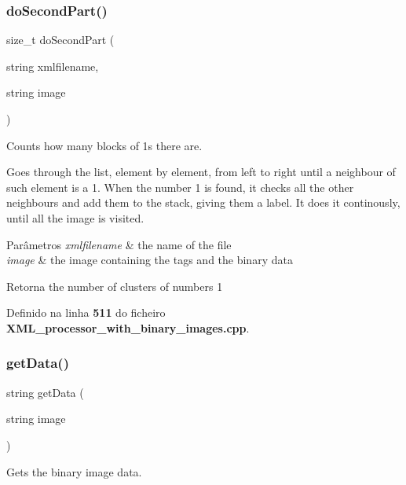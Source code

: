 \subsubsection{do\+Second\+Part()}
{\footnotesize\ttfamily size\+\_\+t do\+Second\+Part (\begin{DoxyParamCaption}\item[{string}]{xmlfilename,  }\item[{string}]{image }\end{DoxyParamCaption})}



Counts how many blocks of 1\textquotesingle{}s there are. 

Goes through the list, element by element, from left to right until a neighbour of such element is a 1. When the number 1 is found, it checks all the other neighbours and add them to the stack, giving them a label. It does it continously, until all the image is visited. 
\begin{DoxyParams}{Parâmetros}
{\em xmlfilename} & the name of the file \\
\hline
{\em image} & the image containing the tags and the binary data \\
\hline
\end{DoxyParams}
\begin{DoxyReturn}{Retorna}
the number of clusters of numbers 1 
\end{DoxyReturn}


Definido na linha \textbf{ 511} do ficheiro \textbf{ X\+M\+L\+\_\+processor\+\_\+with\+\_\+binary\+\_\+images.\+cpp}.

\mbox{\label{_x_m_l__processor__with__binary__images_8cpp_ab3fcc8f0037aae0c9101a32b0612da78}} 
\subsubsection{get\+Data()}
{\footnotesize\ttfamily string get\+Data (\begin{DoxyParamCaption}\item[{string}]{image }\end{DoxyParamCaption})}



Gets the binary image data. 


